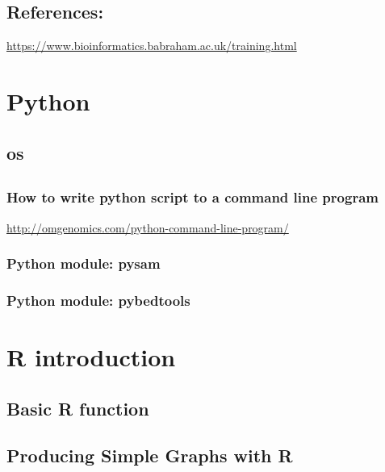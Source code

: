 \documentclass[]{book}
\theoremstyle{definition}
\theoremstyle{definition}
\theoremstyle{definition}
\theoremstyle{remark}
\begin{document}
\section{References:}\label{references}

\url{https://www.bioinformatics.babraham.ac.uk/training.html}

\chapter{Python}\label{python}

\section{os}\label{os}

\section{}\label{section-12}

\subsection{How to write python script to a command line
program}\label{how-to-write-python-script-to-a-command-line-program}

\url{http://omgenomics.com/python-command-line-program/}

\subsection{Python module: pysam}\label{python-module-pysam}

\subsection{Python module: pybedtools}\label{python-module-pybedtools}

\chapter{R introduction}\label{r-introduction}

\section{Basic R function}\label{basic-r-function}

\section{Producing Simple Graphs with
R}\label{producing-simple-graphs-with-r}
\end{document}
